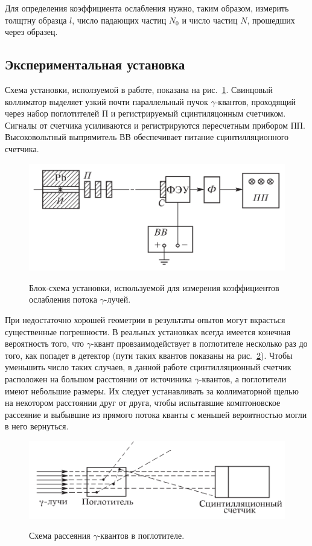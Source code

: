 \documentclass[a4paper, 12pt]{article}%
\begin{document}
	Для определения коэффициента ослабления нужно, таким образом, измерить толщтну образца $l$, число падающих частиц $N_0$ и число частиц $N$, прошедших через образец.
	
\subsection{Экспериментальная установка}
	Схема установки, исползуемой в работе, показана на рис.~\ref{fig:ustanovka1}. Свинцовый коллиматор выделяет узкий почти параллельный пучок $\gamma$-квантов, проходящий через набор поглотителей П и регистрируемый сцинтиляцонным счетчиком. Сигналы от счетчика усиливаются и регистрируются пересчетным прибором ПП. Высоковольтный выпрямитель ВВ обеспечивает питание сцинтилляционного счетчика.
	
	\begin{figure}[h!]
			{\includegraphics[scale=1.5]{ustanovka1.pdf}}    
		\caption{Блок-схема установки, используемой для измерения коэффициентов ослабления потока $\gamma$-лучей.}\label{fig:ustanovka1}
	\end{figure}

	При недостаточно хорошей геометрии в результаты опытов могут вкрасться существенные погрешности. В реальных установках всегда имеется конечная вероятность того, что $\gamma$-квант провзаимодействует в поглотителе несколько раз до того, как попадет в детектор (пути таких квантов показаны на рис.~\ref{fig:ustanovka2}). Чтобы уменьшить число таких случаев, в данной работе сцинтилляционный счетчик расположен на большом расстоянии от источиника $\gamma$-квантов, а поглотители имеют небольшие размеры. Их следует устанавливать за коллиматорной щелью на некотором расстоянии друг от друга, чтобы испытавшие комптоновское рассеяние и выбывшие из прямого потока кванты с меньшей вероятностью могли в него вернуться.

	\begin{figure}[h!]
			{\includegraphics[scale=1.5]{ustanovka2.pdf}}    
		\caption{Схема рассеяния $\gamma$-квантов в поглотителе.}\label{fig:ustanovka2}
	\end{figure}
	
\end{document}
